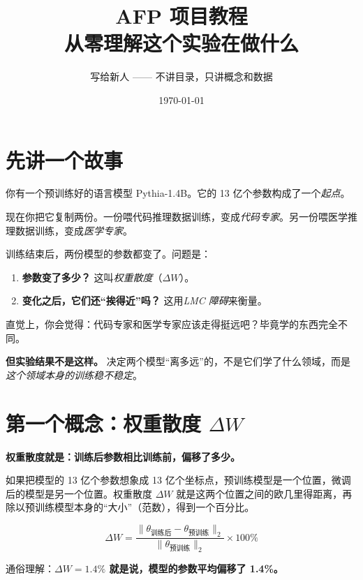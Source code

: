 \documentclass[12pt,a4paper]{ctexart}
\begin{document}
\title{\textbf{AFP 项目教程}\\[4pt]{\Large 从零理解这个实验在做什么}}
\author{写给新人 —— 不讲目录，只讲概念和数据}
\date{\today}
\maketitle
\thispagestyle{fancy}

\section*{先讲一个故事}

你有一个预训练好的语言模型 Pythia-1.4B。它的 13 亿个参数构成了一个\emph{起点}。

现在你把它复制两份。一份喂代码推理数据训练，变成\emph{代码专家}。另一份喂医学推理数据训练，变成\emph{医学专家}。

训练结束后，两份模型的参数都变了。问题是：

\begin{enumerate}
  \item \textbf{参数变了多少？} 这叫\emph{权重散度}（$\Delta W$）。
  \item \textbf{变化之后，它们还``挨得近''吗？} 这用\emph{LMC 障碍}来衡量。
\end{enumerate}

直觉上，你会觉得：代码专家和医学专家应该走得挺远吧？毕竟学的东西完全不同。

\textbf{但实验结果不是这样。} 决定两个模型``离多远''的，不是它们学了什么领域，而是\emph{这个领域本身的训练稳不稳定}。

\section{第一个概念：权重散度 \texorpdfstring{$\Delta W$}{}}

\begin{explainbox}
\textbf{权重散度就是：训练后参数相比训练前，偏移了多少。}

如果把模型的 13 亿个参数想象成 13 亿个坐标点，预训练模型是一个位置，微调后的模型是另一个位置。权重散度 $\Delta W$ 就是这两个位置之间的欧几里得距离，再除以预训练模型本身的``大小''（范数），得到一个百分比。

\[
\Delta W = \frac{\|\theta_{\text{训练后}} - \theta_{\text{预训练}}\|_2}{\|\theta_{\text{预训练}}\|_2} \times 100\%
\]

通俗理解：\textbf{$\Delta W = 1.4\%$ 就是说，模型的参数平均偏移了 1.4\%。}
\end{explainbox}
\end{document}
